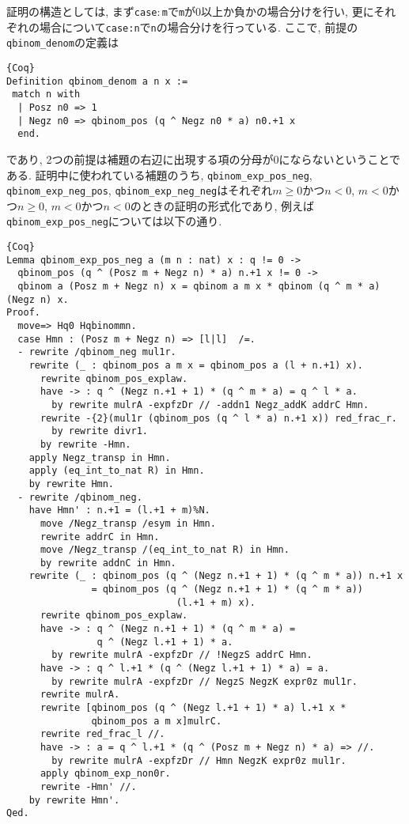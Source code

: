 \documentclass[11pt]{jsreport}
\theoremstyle{mystyle}
\newcommand{\0}{\textbf{0}}
\newcommand{\1}{\textbf{1}}
\newcommand{\2}{\textbf{2}}
\begin{document}
証明の構造としては, まず{\tt case$\colon$m}で{\tt m}が$0$以上か負かの場合分けを行い, 更にそれぞれの場合について{\tt case:n}で{\tt n}の場合分けを行っている. 
ここで, 前提の{\tt qbinom\_denom}の定義は
\begin{lstlisting}{Coq}
Definition qbinom_denom a n x :=
 match n with
  | Posz n0 => 1
  | Negz n0 => qbinom_pos (q ^ Negz n0 * a) n0.+1 x
  end. \end{lstlisting}
であり, 2つの前提は補題の右辺に出現する項の分母が$0$にならないということである. 
証明中に使われている補題のうち, {\tt qbinom\_exp\_pos\_neg}, {\tt qbinom\_exp\_neg\_pos}, {\tt qbinom\_exp\_neg\_neg}はそれぞれ$m \ge 0$かつ$n < 0$, $m <0$かつ$n \ge 0$, $m < 0$かつ$n < 0$のときの証明の形式化であり, 例えば{\tt qbinom\_exp\_pos\_neg}については以下の通り. 
\begin{lstlisting}{Coq}
Lemma qbinom_exp_pos_neg a (m n : nat) x : q != 0 ->
  qbinom_pos (q ^ (Posz m + Negz n) * a) n.+1 x != 0 ->
  qbinom a (Posz m + Negz n) x = qbinom a m x * qbinom (q ^ m * a) (Negz n) x.
Proof.
  move=> Hq0 Hqbinommn.
  case Hmn : (Posz m + Negz n) => [l|l]  /=.
  - rewrite /qbinom_neg mul1r.
    rewrite (_ : qbinom_pos a m x = qbinom_pos a (l + n.+1) x).
      rewrite qbinom_pos_explaw.
      have -> : q ^ (Negz n.+1 + 1) * (q ^ m * a) = q ^ l * a.
        by rewrite mulrA -expfzDr // -addn1 Negz_addK addrC Hmn.
      rewrite -{2}(mul1r (qbinom_pos (q ^ l * a) n.+1 x)) red_frac_r.
        by rewrite divr1.
      by rewrite -Hmn.
    apply Negz_transp in Hmn.
    apply (eq_int_to_nat R) in Hmn.
    by rewrite Hmn.
  - rewrite /qbinom_neg.
    have Hmn' : n.+1 = (l.+1 + m)%N.
      move /Negz_transp /esym in Hmn.
      rewrite addrC in Hmn.
      move /Negz_transp /(eq_int_to_nat R) in Hmn.
      by rewrite addnC in Hmn.
    rewrite (_ : qbinom_pos (q ^ (Negz n.+1 + 1) * (q ^ m * a)) n.+1 x 
               = qbinom_pos (q ^ (Negz n.+1 + 1) * (q ^ m * a))
                              (l.+1 + m) x).
      rewrite qbinom_pos_explaw.
      have -> : q ^ (Negz n.+1 + 1) * (q ^ m * a) =
                q ^ (Negz l.+1 + 1) * a.
        by rewrite mulrA -expfzDr // !NegzS addrC Hmn.
      have -> : q ^ l.+1 * (q ^ (Negz l.+1 + 1) * a) = a.
        by rewrite mulrA -expfzDr // NegzS NegzK expr0z mul1r.
      rewrite mulrA.
      rewrite [qbinom_pos (q ^ (Negz l.+1 + 1) * a) l.+1 x *
               qbinom_pos a m x]mulrC.
      rewrite red_frac_l //.
      have -> : a = q ^ l.+1 * (q ^ (Posz m + Negz n) * a) => //.
        by rewrite mulrA -expfzDr // Hmn NegzK expr0z mul1r.
      apply qbinom_exp_non0r.
      rewrite -Hmn' //.
    by rewrite Hmn'.
Qed.
\end{lstlisting}
\end{document}
